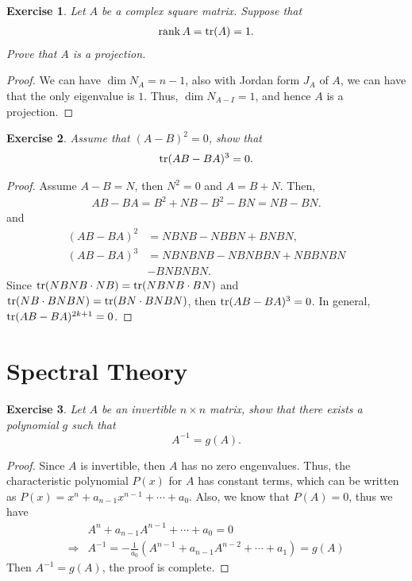 \documentclass[11pt]{book}
\newtheorem{exercise}{Exercise}[section]
\theoremstyle{definition}
\numberwithin{equation}{subsection}
\begin{document}
\medskip

\begin{exercise}
Let $A$ be a complex square matrix. Suppose that 
\begin{align*}
    \rank A = {\rm tr} (A) = 1.
\end{align*}
Prove that $A$ is a projection.
\end{exercise}
\begin{proof}
We can have $\dim N_A = n-1$, also with Jordan form $J_A$ of $A$, we can have that the only eigenvalue is $1$. Thus, $\dim N_{A-I} = 1$, and hence $A$ is a projection.
\end{proof}

\medskip

\begin{exercise}{\bf *}
Assume that $(A - B)^2 = 0$, show that 
\begin{align*}
    {\rm tr} (AB - BA)^3 = 0.
\end{align*}
\end{exercise}
\begin{proof}
Assume $A - B = N$, then $N^2 = 0$ and $A = B + N$. Then,
\begin{align*}
    AB - BA = B^2 + NB - B^2 - BN = NB - BN.
\end{align*}
and
\begin{align*}
    (AB - BA)^2 & = NBNB - NBBN + BNBN, \\
    (AB - BA)^3 & = NBNBNB - NBNBBN + NBBNBN \\
    & - BNBNBN.
\end{align*}
Since ${\rm tr} (NBNB \cdot NB) = {\rm tr} (NBNB \cdot BN)$ and ${\rm tr} (NB \cdot BNBN) = {\rm tr} (BN \cdot BNBN)$, then ${\rm tr} (AB - BA)^3 = 0$. In general, ${\rm tr} (AB - BA)^{2k+1} = 0$.
\end{proof}

\medskip


\section{Spectral Theory}
\begin{exercise}
Let $A$ be an invertible $n\times n$ matrix, show that there exists a
polynomial $g$ such that
$$
A^{-1}=g\left(A\right).
$$
\end{exercise}
\begin{proof}
Since $A$ is invertible, then $A$ has no zero engenvalues. Thus, the characteristic polynomial $P(x)$ for $A$ has constant terms, which can be written as $P(x)= x^n + a_{n-1} x^{n-1} + \cdots + a_0$. Also, we know that $P(A)=0$, thus we have
\begin{align*}
    & A^n + a_{n-1} A^{n-1} + \cdots + a_0 = 0 \\
    \Rightarrow & A^{-1} = -\frac{1}{a_0}(A^{n-1}+a_{n-1}A^{n-2}+\cdots+a_1) = g(A)
\end{align*}
Then $A^{-1}=g(A)$, the proof is complete. 
\end{proof}
\end{document}
